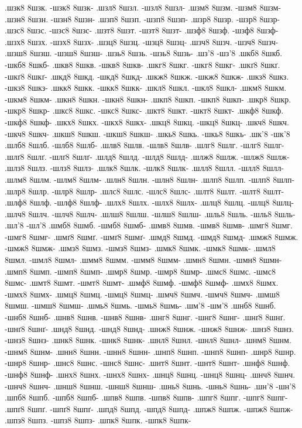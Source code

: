 {.шзк8 8шзк. -шзк8 8шзк-
.шзл8 8шзл. -шзл8 8шзл-
.шзм8 8шзм. -шзм8 8шзм-
.шзн8 8шзн. -шзн8 8шзн-
.шзп8 8шзп. -шзп8 8шзп-
.шзр8 8шзр. -шзр8 8шзр-
.шзс8 8шзс. -шзс8 8шзс-
.шзт8 8шзт. -шзт8 8шзт-
.шзф8 8шзф. -шзф8 8шзф-
.шзх8 8шзх. -шзх8 8шзх-
.шзц8 8шзц. -шзц8 8шзц-
.шзч8 8шзч. -шзч8 8шзч-
.шзш8 8шзш. -шзш8 8шзш-
.шзь8 8шзь. -шзь8 8шзь-
.шз'8 -шз'8
.шкб8 8шкб. -шкб8 8шкб-
.шкв8 8шкв. -шкв8 8шкв-
.шкг8 8шкг. -шкг8 8шкг-
.шкґ8 8шкґ. -шкґ8 8шкґ-
.шкд8 8шкд. -шкд8 8шкд-
.шкж8 8шкж. -шкж8 8шкж-
.шкз8 8шкз. -шкз8 8шкз-
.шкк8 8шкк. -шкк8 8шкк-
.шкл8 8шкл. -шкл8 8шкл-
.шкм8 8шкм. -шкм8 8шкм-
.шкн8 8шкн. -шкн8 8шкн-
.шкп8 8шкп. -шкп8 8шкп-
.шкр8 8шкр. -шкр8 8шкр-
.шкс8 8шкс. -шкс8 8шкс-
.шкт8 8шкт. -шкт8 8шкт-
.шкф8 8шкф. -шкф8 8шкф-
.шкх8 8шкх. -шкх8 8шкх-
.шкц8 8шкц. -шкц8 8шкц-
.шкч8 8шкч. -шкч8 8шкч-
.шкш8 8шкш. -шкш8 8шкш-
.шкь8 8шкь. -шкь8 8шкь-
.шк'8 -шк'8
.шлб8 8шлб. -шлб8 8шлб-
.шлв8 8шлв. -шлв8 8шлв-
.шлг8 8шлг. -шлг8 8шлг-
.шлґ8 8шлґ. -шлґ8 8шлґ-
.шлд8 8шлд. -шлд8 8шлд-
.шлж8 8шлж. -шлж8 8шлж-
.шлз8 8шлз. -шлз8 8шлз-
.шлк8 8шлк. -шлк8 8шлк-
.шлл8 8шлл. -шлл8 8шлл-
.шлм8 8шлм. -шлм8 8шлм-
.шлн8 8шлн. -шлн8 8шлн-
.шлп8 8шлп. -шлп8 8шлп-
.шлр8 8шлр. -шлр8 8шлр-
.шлс8 8шлс. -шлс8 8шлс-
.шлт8 8шлт. -шлт8 8шлт-
.шлф8 8шлф. -шлф8 8шлф-
.шлх8 8шлх. -шлх8 8шлх-
.шлц8 8шлц. -шлц8 8шлц-
.шлч8 8шлч. -шлч8 8шлч-
.шлш8 8шлш. -шлш8 8шлш-
.шль8 8шль. -шль8 8шль-
.шл'8 -шл'8
.шмб8 8шмб. -шмб8 8шмб-
.шмв8 8шмв. -шмв8 8шмв-
.шмг8 8шмг. -шмг8 8шмг-
.шмґ8 8шмґ. -шмґ8 8шмґ-
.шмд8 8шмд. -шмд8 8шмд-
.шмж8 8шмж. -шмж8 8шмж-
.шмз8 8шмз. -шмз8 8шмз-
.шмк8 8шмк. -шмк8 8шмк-
.шмл8 8шмл. -шмл8 8шмл-
.шмм8 8шмм. -шмм8 8шмм-
.шмн8 8шмн. -шмн8 8шмн-
.шмп8 8шмп. -шмп8 8шмп-
.шмр8 8шмр. -шмр8 8шмр-
.шмс8 8шмс. -шмс8 8шмс-
.шмт8 8шмт. -шмт8 8шмт-
.шмф8 8шмф. -шмф8 8шмф-
.шмх8 8шмх. -шмх8 8шмх-
.шмц8 8шмц. -шмц8 8шмц-
.шмч8 8шмч. -шмч8 8шмч-
.шмш8 8шмш. -шмш8 8шмш-
.шмь8 8шмь. -шмь8 8шмь-
.шм'8 -шм'8
.шнб8 8шнб. -шнб8 8шнб-
.шнв8 8шнв. -шнв8 8шнв-
.шнг8 8шнг. -шнг8 8шнг-
.шнґ8 8шнґ. -шнґ8 8шнґ-
.шнд8 8шнд. -шнд8 8шнд-
.шнж8 8шнж. -шнж8 8шнж-
.шнз8 8шнз. -шнз8 8шнз-
.шнк8 8шнк. -шнк8 8шнк-
.шнл8 8шнл. -шнл8 8шнл-
.шнм8 8шнм. -шнм8 8шнм-
.шнн8 8шнн. -шнн8 8шнн-
.шнп8 8шнп. -шнп8 8шнп-
.шнр8 8шнр. -шнр8 8шнр-
.шнс8 8шнс. -шнс8 8шнс-
.шнт8 8шнт. -шнт8 8шнт-
.шнф8 8шнф. -шнф8 8шнф-
.шнх8 8шнх. -шнх8 8шнх-
.шнц8 8шнц. -шнц8 8шнц-
.шнч8 8шнч. -шнч8 8шнч-
.шнш8 8шнш. -шнш8 8шнш-
.шнь8 8шнь. -шнь8 8шнь-
.шн'8 -шн'8
.шпб8 8шпб. -шпб8 8шпб-
.шпв8 8шпв. -шпв8 8шпв-
.шпг8 8шпг. -шпг8 8шпг-
.шпґ8 8шпґ. -шпґ8 8шпґ-
.шпд8 8шпд. -шпд8 8шпд-
.шпж8 8шпж. -шпж8 8шпж-
.шпз8 8шпз. -шпз8 8шпз-
.шпк8 8шпк. -шпк8 8шпк-
}

